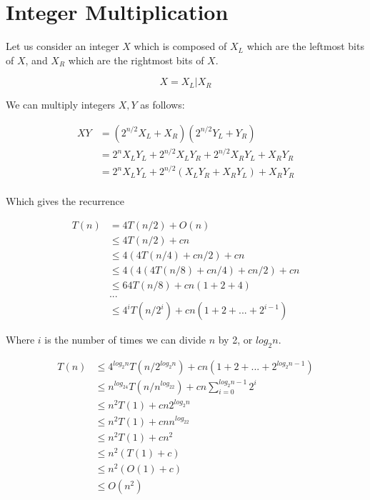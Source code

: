 \chapter{Integer Multiplication}

Let us consider an integer $X$ which is composed of $X_L$ which are
the leftmost bits of $X$, and $X_R$ which are the rightmost bits of
$X$.

\begin{displaymath}
X = X_L | X_R
\end{displaymath}

We can multiply integers $X,Y$ as follows:

\begin{align*}
XY
&= (2^{n/2}X_L + X_R)(2^{n/2}Y_L + Y_R) \\
&= 2^n X_LY_L + 2^{n/2}X_LY_R + 2^{n/2}X_RY_L + X_RY_R \\
&= 2^n X_LY_L + 2^{n/2}(X_LY_R + X_RY_L) + X_RY_R \\
\end{align*}

Which gives the recurrence

\begin{align*}
T(n)
&= 4T(n/2) + O(n) \\
&\leq 4T(n/2) + cn \\
&\leq 4(4T(n/4) + cn/2) + cn \\
&\leq 4(4(4T(n/8) + cn/4) + cn/2) + cn \\
&\leq 64T(n/8) + cn(1 + 2 + 4) \\
&... \\
&\leq 4^iT(n/2^i) + cn(1 + 2 + ... + 2^{i-1})
\end{align*}

Where $i$ is the number of times we can divide $n$ by 2, or $log_2n$.

\begin{align*}
T(n)
&\leq 4^{log_2n}T(n/2^{log_2n}) + cn(1 + 2 + ... + 2^{log_2n-1}) \\
&\leq n^{log_24}T(n/n^{log_22}) + cn \sum\limits_{i=0}^{log_2n-1} 2^i \\
&\leq n^2T(1) + cn 2^{log_2n} \\
&\leq n^2T(1) + cn n^{log_22} \\
&\leq n^2T(1) + cn^2 \\
&\leq n^2(T(1) + c) \\
&\leq n^2(O(1) + c) \\
&\leq O(n^2)
\end{align*}

